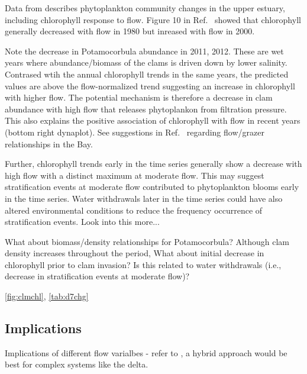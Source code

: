 \documentclass[journal = esthag, manuscript = article]{achemso}\usepackage[]{graphicx}\usepackage[]{color}
\begin{document}
Data from \cite{Crauder16,Jassby08} describes phytoplankton community changes in the upper estuary, including chlorophyll response to flow.  Figure 10 in Ref.~ showed that chlorophyll generally decreased with flow in 1980 but inreased with flow in 2000.

Note the decrease in Potamocorbula abundance in 2011, 2012.  These are wet years where abundance/biomass of the clams is driven down by lower salinity.  Contrased wtih the annual chlorophyll trends in the same years, the predicted values are above the flow-normalized trend suggesting an increase in chlorophyll with higher flow.  The potential mechanism is therefore a decrease in clam abundance with high flow that releases phytoplankon from filtration pressure.  This also explains the positive association of chlorophyll with flow in recent years (bottom right dynaplot). See suggestions in Ref.~ regarding flow/grazer relationships in the Bay. 

Further, chlorophyll trends early in the time series generally show a decrease with high flow with a distinct maximum at moderate flow.  This may suggest stratification events at moderate flow contributed to phytoplankton blooms early in the time series. Water withdrawals later in the time series could have also altered environmental conditions to reduce the frequency occurrence of stratification events.  Look into this more...

What about biomass/density relationships for Potamocorbula?  Although clam density increases throughout the period,  What about initial decrease in chlorophyll prior to clam invasion?  Is this related to water withdrawals (i.e., decrease in stratification events at moderate flow)?

\cref{fig:clmchl}, \cref{tab:d7chg}

\subsection{Implications}

Implications of different flow varialbes - refer to \cite{Novick15}, a hybrid approach would be best for complex systems like the delta.
\end{document}
